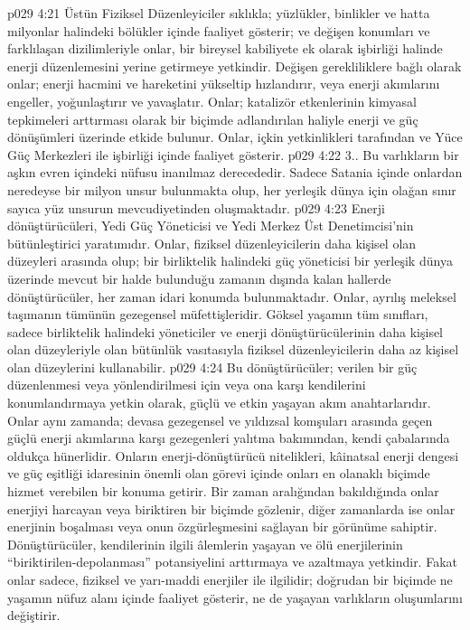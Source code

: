 \vs p029 4:21 Üstün Fiziksel Düzenleyiciler sıklıkla; yüzlükler, binlikler ve hatta milyonlar halindeki bölükler içinde faaliyet gösterir; ve değişen konumları ve farklılaşan dizilimleriyle onlar, bir bireysel kabiliyete ek olarak işbirliği halinde enerji düzenlemesini yerine getirmeye yetkindir. Değişen gerekliliklere bağlı olarak onlar; enerji hacmini ve hareketini yükseltip hızlandırır, veya enerji akımlarını engeller, yoğunlaştırır ve yavaşlatır. Onlar; katalizör etkenlerinin kimyasal tepkimeleri arttırması olarak bir biçimde adlandırılan haliyle enerji ve güç dönüşümleri üzerinde etkide bulunur. Onlar, içkin yetkinlikleri tarafından ve Yüce Güç Merkezleri ile işbirliği içinde faaliyet gösterir.
\vs p029 4:22 3.\bibnobreakspace {}. Bu varlıkların bir aşkın evren içindeki nüfusu inanılmaz derecededir. Sadece Satania içinde onlardan neredeyse bir milyon unsur bulunmakta olup, her yerleşik dünya için olağan sınır sayıca yüz unsurun mevcudiyetinden oluşmaktadır.
\vs p029 4:23 Enerji dönüştürücüleri, Yedi Güç Yöneticisi ve Yedi Merkez Üst Denetimcisi’nin bütünleştirici yaratımıdır. Onlar, fiziksel düzenleyicilerin daha kişisel olan düzeyleri arasında olup; bir birliktelik halindeki güç yöneticisi bir yerleşik dünya üzerinde mevcut bir halde bulunduğu zamanın dışında kalan hallerde dönüştürücüler, her zaman idari konumda bulunmaktadır. Onlar, ayrılış meleksel taşımanın tümünün gezegensel müfettişleridir. Göksel yaşamın tüm sınıfları, sadece birliktelik halindeki yöneticiler ve enerji dönüştürücülerinin daha kişisel olan düzeyleriyle olan bütünlük vasıtasıyla fiziksel düzenleyicilerin daha az kişisel olan düzeylerini kullanabilir.
\vs p029 4:24 Bu dönüştürücüler; verilen bir güç düzenlenmesi veya yönlendirilmesi için veya ona karşı kendilerini konumlandırmaya yetkin olarak, güçlü ve etkin yaşayan akım anahtarlarıdır. Onlar aynı zamanda; devasa gezegensel ve yıldızsal komşuları arasında geçen güçlü enerji akımlarına karşı gezegenleri yalıtma bakımından, kendi çabalarında oldukça hünerlidir. Onların enerji\hyp{}dönüştürücü nitelikleri, kâinatsal enerji dengesi ve güç eşitliği idaresinin önemli olan görevi içinde onları en olanaklı biçimde hizmet verebilen bir konuma getirir. Bir zaman aralığından bakıldığında onlar enerjiyi harcayan veya biriktiren bir biçimde gözlenir, diğer zamanlarda ise onlar enerjinin boşalması veya onun özgürleşmesini sağlayan bir görünüme sahiptir. Dönüştürücüler, kendilerinin ilgili âlemlerin yaşayan ve ölü enerjilerinin “biriktirilen\hyp{}depolanması” potansiyelini arttırmaya ve azaltmaya yetkindir. Fakat onlar sadece, fiziksel ve yarı\hyp{}maddi enerjiler ile ilgilidir; doğrudan bir biçimde ne yaşamın nüfuz alanı içinde faaliyet gösterir, ne de yaşayan varlıkların oluşumlarını değiştirir.
